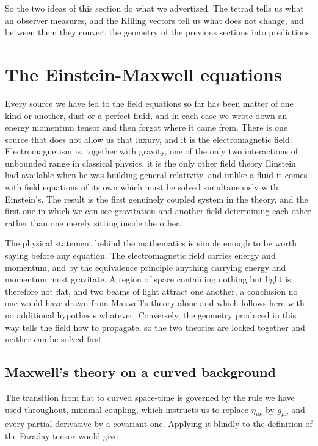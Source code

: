         So the two ideas of this section do what we advertised. The tetrad tells us what an observer measures, and the Killing vectors tell us what does not change, and between them they convert the geometry of the previous sections into predictions.

\section{The Einstein-Maxwell equations}

    Every source we have fed to the field equations so far has been matter of one kind or another, dust or a perfect fluid, and in each case we wrote down an energy momentum tensor and then forgot where it came from. There is one source that does not allow us that luxury, and it is the electromagnetic field. Electromagnetism is, together with gravity, one of the only two interactions of unbounded range in classical physics, it is the only other field theory Einstein had available when he was building general relativity, and unlike a fluid it comes with field equations of its own which must be solved simultaneously with Einstein's. The result is the first genuinely coupled system in the theory, and the first one in which we can see gravitation and another field determining each other rather than one merely sitting inside the other.

    The physical statement behind the mathematics is simple enough to be worth saying before any equation. The electromagnetic field carries energy and momentum, and by the equivalence principle anything carrying energy and momentum must gravitate. A region of space containing nothing but light is therefore not flat, and two beams of light attract one another, a conclusion no one would have drawn from Maxwell's theory alone and which follows here with no additional hypothesis whatever. Conversely, the geometry produced in this way tells the field how to propagate, so the two theories are locked together and neither can be solved first.

    \subsection{Maxwell's theory on a curved background}

        The transition from flat to curved space-time is governed by the rule we have used throughout, minimal coupling, which instructs us to replace $\eta_{\mu\nu}$ by $g_{\mu\nu}$ and every partial derivative by a covariant one. Applying it blindly to the definition of the Faraday tensor would give


